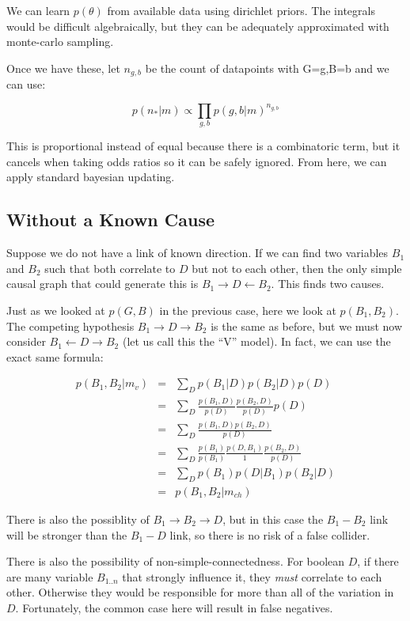 \documentclass[letterpaper]{article}
\begin{document}
We can learn $p(\theta)$ from available data using dirichlet priors.
The integrals would be difficult algebraically, but they can be
adequately approximated with monte-carlo sampling.

Once we have these, let $n_{g,b}$ be the count of datapoints with
G=g,B=b and we can use:

\begin{equation*}
p(n_*|m) \propto \prod_{g,b} p(g,b|m)^{n_{g,b}}
\end{equation*}

This is proportional instead of equal because there is a combinatoric term,
but it cancels when taking odds ratios so it can be safely ignored.
From here, we can apply standard bayesian updating.

\subsection{Without a Known Cause}

Suppose we do not have a link of known direction.  If we can find two
variables $B_1$ and $B_2$ such that both correlate to $D$ but not to
each other, then the only simple causal graph that could generate this
is $B_1 \rightarrow D \leftarrow B_2$.  This finds two causes.

Just as we looked at $p(G,B)$ in the previous case, here we look at
$p(B_1,B_2)$.  The competing hypothesis $B_1 \rightarrow D \rightarrow
B_2$ is the same as before, but we must now consider $B_1 \leftarrow D
\rightarrow B_2$ (let us call this the ``V'' model).  In fact, we can
use the exact same formula:

\begin{eqnarray*}
  p(B_1,B_2|m_v)
  & = & \sum_D p(B_1|D)p(B_2|D)p(D) \\
  & = & \sum_D \frac{p(B_1,D)}{p(D)}\frac{p(B_2,D)}{p(D)}p(D) \\
  & = & \sum_D \frac{p(B_1,D)p(B_2,D)}{p(D)} \\
  & = & \sum_D \frac{p(B_1)}{p(B_1)}\frac{p(D,B_1)}{1}\frac{p(B_2,D)}{p(D)} \\
  & = & \sum_D p(B_1)p(D|B_1)p(B_2|D) \\
  & = & p(B_1,B_2|m_{ch})
\end{eqnarray*}

There is also the possiblity of $B_1\rightarrow B_2 \rightarrow D$,
but in this case the $B_1-B_2$ link will be stronger than the $B_1-D$
link, so there is no risk of a false collider.

There is also the possibility of non-simple-connectedness.  For
boolean $D$, if there are many variable $B_{1..n}$ that strongly
influence it, they \textit{must} correlate to each other.  Otherwise
they would be responsible for more than all of the variation in $D$.
Fortunately, the common case here will result in false negatives.
\end{document}
